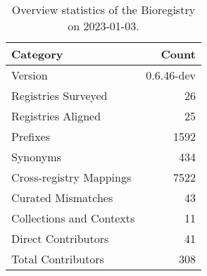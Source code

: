 \begin{table}
\centering
\caption{Overview statistics of the Bioregistry on 2023-01-03.}
\label{tab:bioregistry-summary}
\begin{tabular}{lr}
\toprule
                Category &      Count \\
\midrule
                 Version & 0.6.46-dev \\
     Registries Surveyed &         26 \\
      Registries Aligned &         25 \\
                Prefixes &       1592 \\
                Synonyms &        434 \\
 Cross-registry Mappings &       7522 \\
      Curated Mismatches &         43 \\
Collections and Contexts &         11 \\
     Direct Contributors &         41 \\
      Total Contributors &        308 \\
\bottomrule
\end{tabular}
\end{table}
